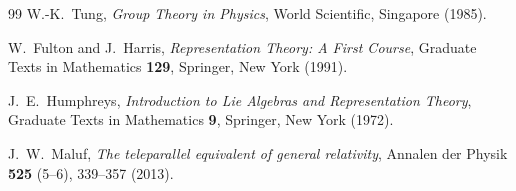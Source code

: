 \documentclass[dvipdfmx,11pt,a4paper]{article}
\theoremstyle{definition}
\theoremstyle{plain}
\theoremstyle{remark}
\begin{document}
\begin{thebibliography}{99}
W.-K.~Tung,
\textit{Group Theory in Physics},
World Scientific, Singapore (1985).

W.~Fulton and J.~Harris,
\textit{Representation Theory: A First Course},
Graduate Texts in Mathematics \textbf{129},
Springer, New York (1991).

J.~E.~Humphreys,
\textit{Introduction to Lie Algebras and Representation Theory},
Graduate Texts in Mathematics \textbf{9},
Springer, New York (1972).

J.~W.~Maluf,
\textit{The teleparallel equivalent of general relativity},
Annalen der Physik \textbf{525} (5--6), 339--357 (2013).

\end{thebibliography}
\end{document}
